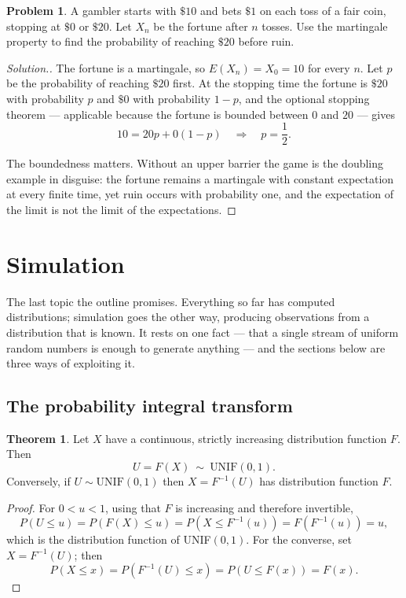 \documentclass[11pt,a4paper]{article}
\theoremstyle{definition}
\newtheorem{thm}{Theorem}[subsection]
\newtheorem{problemx}{Problem}[subsection]
\newenvironment{problem}{\begin{problemx}}{\end{problemx}}
\newenvironment{solution}
  {\renewcommand{\qedsymbol}{}\begin{proof}[\textit{Solution}.]}
  {\end{proof}}
\begin{document}
\begin{problem}
A gambler starts with $\$10$ and bets $\$1$ on each toss of a fair coin,
stopping at $\$0$ or $\$20$. Let $X_n$ be the fortune after $n$ tosses. Use the
martingale property to find the probability of reaching $\$20$ before ruin.
\end{problem}
\begin{solution}
The fortune is a martingale, so $E(X_n) = X_0 = 10$ for every $n$. Let $p$ be
the probability of reaching $\$20$ first. At the stopping time the fortune is
$\$20$ with probability $p$ and $\$0$ with probability $1-p$, and the optional
stopping theorem --- applicable because the fortune is bounded between $0$ and
$20$ --- gives
$$10 = 20p + 0(1-p) \quad\Longrightarrow\quad p = \frac12 .$$

The boundedness matters. Without an upper barrier the game is the doubling
example in disguise: the fortune remains a martingale with constant expectation
at every finite time, yet ruin occurs with probability one, and the expectation
of the limit is not the limit of the expectations.
\end{solution}


\section{Simulation}

The last topic the outline promises. Everything so far has computed
distributions; simulation goes the other way, producing observations from a
distribution that is known. It rests on one fact --- that a single stream of
uniform random numbers is enough to generate anything --- and the sections below
are three ways of exploiting it.

\subsection{The probability integral transform}

\begin{thm}
Let $X$ have a continuous, strictly increasing distribution function $F$. Then
$$U = F(X) \ \sim\ \text{UNIF}(0,1).$$
Conversely, if $U\sim\text{UNIF}(0,1)$ then $X = F^{-1}(U)$ has distribution
function $F$.
\end{thm}

\begin{proof}
For $0<u<1$, using that $F$ is increasing and therefore invertible,
$$P(U\leq u) = P\left(F(X)\leq u\right) = P\left(X \leq F^{-1}(u)\right)
= F\left(F^{-1}(u)\right) = u ,$$
which is the distribution function of UNIF$(0,1)$. For the converse, set
$X=F^{-1}(U)$; then
$$P(X\leq x) = P\left(F^{-1}(U)\leq x\right) = P\left(U\leq F(x)\right) = F(x).$$
\end{proof}
\end{document}
